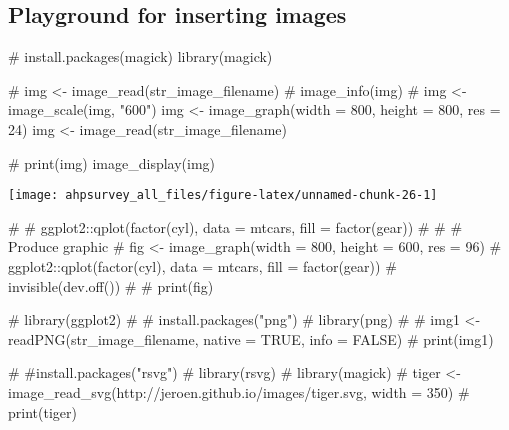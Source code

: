 \documentclass[
]{article}
\newenvironment{Shaded}{\begin{snugshade}}{\end{snugshade}}
\newcommand{\AttributeTok}[1]{\textcolor[rgb]{0.00,0.34,0.68}{#1}}
\newcommand{\CommentTok}[1]{\textcolor[rgb]{0.54,0.53,0.53}{#1}}
\newcommand{\DecValTok}[1]{\textcolor[rgb]{0.69,0.50,0.00}{#1}}
\newcommand{\FunctionTok}[1]{\textcolor[rgb]{0.39,0.29,0.61}{#1}}
\newcommand{\NormalTok}[1]{\textcolor[rgb]{0.12,0.11,0.11}{#1}}
\newcommand{\OtherTok}[1]{\textcolor[rgb]{0.00,0.43,0.16}{#1}}
\begin{document}
\hypertarget{playground-for-inserting-images}{%
\subsection{Playground for inserting
images}\label{playground-for-inserting-images}}

\begin{Shaded}
\begin{Highlighting}[]
\CommentTok{\# install.packages(\textquotesingle{}magick\textquotesingle{})}
\FunctionTok{library}\NormalTok{(magick)}

\CommentTok{\# img \textless{}{-} image\_read(str\_image\_filename)}
\CommentTok{\# image\_info(img)}
\CommentTok{\# img \textless{}{-} image\_scale(img, "600")}
\NormalTok{img }\OtherTok{\textless{}{-}} \FunctionTok{image\_graph}\NormalTok{(}\AttributeTok{width =} \DecValTok{800}\NormalTok{, }\AttributeTok{height =} \DecValTok{800}\NormalTok{, }\AttributeTok{res =} \DecValTok{24}\NormalTok{)}
\NormalTok{img }\OtherTok{\textless{}{-}} \FunctionTok{image\_read}\NormalTok{(str\_image\_filename)}
 
\CommentTok{\# print(img)}
\FunctionTok{image\_display}\NormalTok{(img)}
\end{Highlighting}
\end{Shaded}

\texttt{[image: ahpsurvey\_all\_files/figure-latex/unnamed-chunk-26-1]}

\begin{Shaded}
\begin{Highlighting}[]
\CommentTok{\# \# ggplot2::qplot(factor(cyl), data = mtcars, fill = factor(gear))}
\CommentTok{\# }
\CommentTok{\# \# Produce graphic}
\CommentTok{\# fig \textless{}{-} image\_graph(width = 800, height = 600, res = 96)}
\CommentTok{\# ggplot2::qplot(factor(cyl), data = mtcars, fill = factor(gear))}
\CommentTok{\# invisible(dev.off())}
\CommentTok{\# }
\CommentTok{\# print(fig)}
\end{Highlighting}
\end{Shaded}

\begin{Shaded}
\begin{Highlighting}[]
\CommentTok{\# library(ggplot2)}
\CommentTok{\# \# install.packages("png")}
\CommentTok{\# library(png)}
\CommentTok{\# }
\CommentTok{\# img1 \textless{}{-} readPNG(str\_image\_filename, native = TRUE, info = FALSE)}
\CommentTok{\# print(img1)}
\end{Highlighting}
\end{Shaded}

\begin{Shaded}
\begin{Highlighting}[]
\CommentTok{\# \#install.packages("rsvg")}
\CommentTok{\# library(rsvg)}
\CommentTok{\# library(magick)}
\CommentTok{\# tiger \textless{}{-} image\_read\_svg(\textquotesingle{}http://jeroen.github.io/images/tiger.svg\textquotesingle{}, width = 350)}
\CommentTok{\# print(tiger)}
\end{Highlighting}
\end{Shaded}
\end{document}
